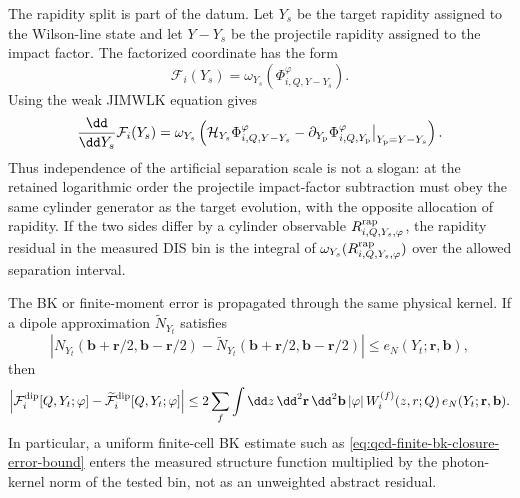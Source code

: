 \begin{controlledapproximation}
The rapidity split is part of the datum.  Let \(Y_s\) be the target rapidity
assigned to the Wilson-line state and let \(Y-Y_s\) be the projectile
rapidity assigned to the impact factor.  The factorized coordinate has the
form
\[
  \mathcal F_i(Y_s)
  =
  \omega_{Y_s}
  \left(
    \Phi_{i,Q,Y-Y_s}^{\varphi}
  \right).
\]
Using the weak JIMWLK equation gives
\begin{equation}
  \frac{\dd}{\dd Y_s}\mathcal F_i(Y_s)
  =
  \omega_{Y_s}
  \left(
    \mathcal H_{Y_s}\Phi_{i,Q,Y-Y_s}^{\varphi}
    -
    \partial_{Y_{\rm p}}
    \Phi_{i,Q,Y_{\rm p}}^{\varphi}\big|_{Y_{\rm p}=Y-Y_s}
  \right).
  \label{eq:qcd-small-x-dis-rapidity-split-derivative}
\end{equation}
Thus independence of the artificial separation scale is not a slogan: at the
retained logarithmic order the projectile impact-factor subtraction must obey
the same cylinder generator as the target evolution, with the opposite
allocation of rapidity.  If the two sides differ by a cylinder observable
\(R^{\rm rap}_{i,Q,Y_s,\varphi}\), the rapidity residual in the measured DIS
bin is the integral of
\(\omega_{Y_s}(R^{\rm rap}_{i,Q,Y_s,\varphi})\) over the allowed separation
interval.

The BK or finite-moment error is propagated through the same physical kernel.
If a dipole approximation \(\widetilde N_{Y_t}\) satisfies
\[
  |N_{Y_t}(\mathbf b+\mathbf r/2,\mathbf b-\mathbf r/2)
    -\widetilde N_{Y_t}(\mathbf b+\mathbf r/2,\mathbf b-\mathbf r/2)|
  \leq e_N(Y_t;\mathbf r,\mathbf b),
\]
then
\begin{equation}
  \left|
    \mathcal F_i^{\rm dip}[Q,Y_t;\varphi]
    -
    \widetilde{\mathcal F}_i^{\rm dip}[Q,Y_t;\varphi]
  \right|
  \leq
  2\sum_f
  \int\dd z\,\dd^2\mathbf r\,\dd^2\mathbf b\,
  |\varphi|\,W_i^{(f)}(z,r;Q)\,
  e_N(Y_t;\mathbf r,\mathbf b).
  \label{eq:qcd-small-x-dis-bk-error-propagation}
\end{equation}
In particular, a uniform finite-cell BK estimate such as
\eqref{eq:qcd-finite-bk-closure-error-bound} enters the measured structure
function multiplied by the photon-kernel norm of the tested bin, not as an
unweighted abstract residual.


\end{controlledapproximation}
